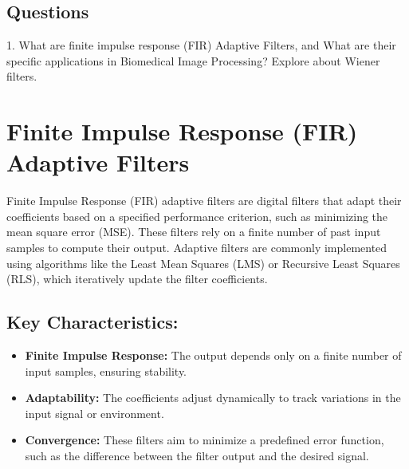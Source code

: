 \documentclass[hidelinks,12pt]{article}
\begin{document}
	\subsection{Questions}
	1. What are finite impulse response (FIR) Adaptive Filters, and What are their specific applications in Biomedical Image Processing? Explore about Wiener filters.
	
	
	\section*{Finite Impulse Response (FIR) Adaptive Filters}
	Finite Impulse Response (FIR) adaptive filters are digital filters that adapt their coefficients based on a specified performance criterion, such as minimizing the mean square error (MSE). These filters rely on a finite number of past input samples to compute their output. Adaptive filters are commonly implemented using algorithms like the Least Mean Squares (LMS) or Recursive Least Squares (RLS), which iteratively update the filter coefficients.
	
	\subsection*{Key Characteristics:}
	\begin{itemize}
		\item \textbf{Finite Impulse Response:} The output depends only on a finite number of input samples, ensuring stability.
		\item \textbf{Adaptability:} The coefficients adjust dynamically to track variations in the input signal or environment.
		\item \textbf{Convergence:} These filters aim to minimize a predefined error function, such as the difference between the filter output and the desired signal.
	\end{itemize}
	
\end{document}
